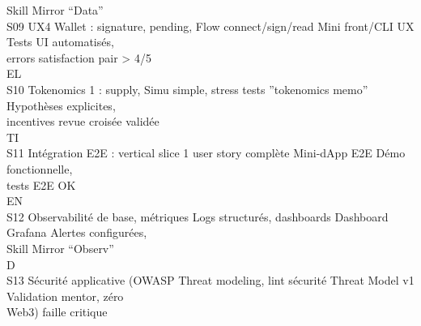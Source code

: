 \documentclass[12pt,landscape,a4paper]{article}
\begin{document}
Skill Mirror “Data”\\
S09     UX4 Wallet : signature, pending,     Flow connect/sign/read             Mini front/CLI UX        Tests UI automatisés,\\
errors                                                                                           satisfaction pair \textgreater{} 4/5\\
\vspace{0.5em}
\vspace{0.5em}
\vspace{0.5em}
\vspace{0.5em}
EL\\
S10     Tokenomics 1 : supply,               Simu simple, stress tests          ”tokenomics memo”        Hypothèses explicites,\\
incentives                                                                                       revue croisée validée\\
\vspace{0.5em}
\vspace{0.5em}
\vspace{0.5em}
\vspace{0.5em}
TI\\
S11     Intégration E2E : vertical slice     1 user story complète              Mini-dApp E2E            Démo fonctionnelle,\\
tests E2E OK\\
\vspace{0.5em}
\vspace{0.5em}
\vspace{0.5em}
\vspace{0.5em}
EN\\
S12     Observabilité de base, métriques     Logs structurés, dashboards        Dashboard Grafana        Alertes configurées,\\
Skill Mirror “Observ”\\
\vspace{0.5em}
\vspace{0.5em}
\vspace{0.5em}
\vspace{0.5em}
D\\
S13     Sécurité applicative (OWASP          Threat modeling, lint sécurité     Threat Model v1          Validation mentor, zéro\\
Web3)                                                                                            faille critique\\
\vspace{0.5em}
\end{document}
